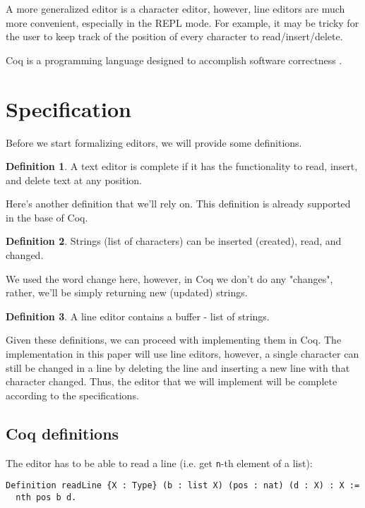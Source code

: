\documentclass{article}
\theoremstyle{definition}
\newtheorem{definition}{Definition}[section]
\begin{document}
A more generalized editor is a character editor, however, line editors are much more convenient, especially in the REPL mode. For example, it may be tricky for the user to keep track of the position of every character to read/insert/delete.

Coq is a programming language designed to accomplish software correctness \cite{b2}.

\section{Specification}

Before we start formalizing editors, we will provide some definitions.

\theoremstyle{definition}
\begin{definition}
A text editor is complete if it has the functionality to read, insert, and delete text at any position.
\end{definition}

Here's another definition that we'll rely on. This definition is already supported in the base of Coq.

\theoremstyle{definition}
\begin{definition}
Strings (list of characters) can be inserted (created), read, and changed.
\end{definition}

We used the word change here, however, in Coq we don't do any "changes", rather, we'll be simply returning new (updated) strings.

\theoremstyle{definition}
\begin{definition}
A line editor contains a buffer - list of strings.
\end{definition}

Given these definitions, we can proceed with implementing them in Coq. The implementation in this paper will use line editors, however, a single character can still be changed in a line by deleting the line and inserting a new line with that character changed. Thus, the editor that we will implement will be complete according to the specifications.

\subsection{Coq definitions}

The editor has to be able to read a line (i.e. get \texttt{n}-th element of a list):

\begin{lstlisting}
Definition readLine {X : Type} (b : list X) (pos : nat) (d : X) : X :=
  nth pos b d.
\end{lstlisting}
\end{document}
